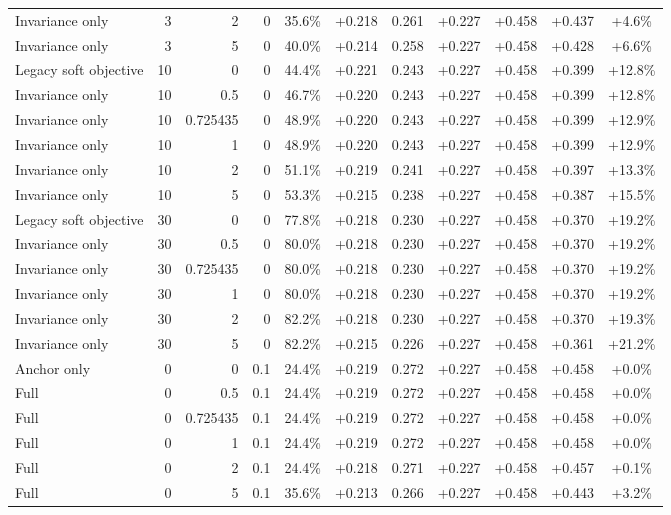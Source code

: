\begin{table}[htbp]
\begin{tabular}{lrrrccccccc}
Invariance only & 3 & 2 & 0 & 35.6\% & +0.218 & 0.261 & +0.227 & +0.458 & +0.437 & +4.6\% \\
Invariance only & 3 & 5 & 0 & 40.0\% & +0.214 & 0.258 & +0.227 & +0.458 & +0.428 & +6.6\% \\
Legacy soft objective & 10 & 0 & 0 & 44.4\% & +0.221 & 0.243 & +0.227 & +0.458 & +0.399 & +12.8\% \\
Invariance only & 10 & 0.5 & 0 & 46.7\% & +0.220 & 0.243 & +0.227 & +0.458 & +0.399 & +12.8\% \\
Invariance only & 10 & 0.725435 & 0 & 48.9\% & +0.220 & 0.243 & +0.227 & +0.458 & +0.399 & +12.9\% \\
Invariance only & 10 & 1 & 0 & 48.9\% & +0.220 & 0.243 & +0.227 & +0.458 & +0.399 & +12.9\% \\
Invariance only & 10 & 2 & 0 & 51.1\% & +0.219 & 0.241 & +0.227 & +0.458 & +0.397 & +13.3\% \\
Invariance only & 10 & 5 & 0 & 53.3\% & +0.215 & 0.238 & +0.227 & +0.458 & +0.387 & +15.5\% \\
Legacy soft objective & 30 & 0 & 0 & 77.8\% & +0.218 & 0.230 & +0.227 & +0.458 & +0.370 & +19.2\% \\
Invariance only & 30 & 0.5 & 0 & 80.0\% & +0.218 & 0.230 & +0.227 & +0.458 & +0.370 & +19.2\% \\
Invariance only & 30 & 0.725435 & 0 & 80.0\% & +0.218 & 0.230 & +0.227 & +0.458 & +0.370 & +19.2\% \\
Invariance only & 30 & 1 & 0 & 80.0\% & +0.218 & 0.230 & +0.227 & +0.458 & +0.370 & +19.2\% \\
Invariance only & 30 & 2 & 0 & 82.2\% & +0.218 & 0.230 & +0.227 & +0.458 & +0.370 & +19.3\% \\
Invariance only & 30 & 5 & 0 & 82.2\% & +0.215 & 0.226 & +0.227 & +0.458 & +0.361 & +21.2\% \\
Anchor only & 0 & 0 & 0.1 & 24.4\% & +0.219 & 0.272 & +0.227 & +0.458 & +0.458 & +0.0\% \\
Full & 0 & 0.5 & 0.1 & 24.4\% & +0.219 & 0.272 & +0.227 & +0.458 & +0.458 & +0.0\% \\
Full & 0 & 0.725435 & 0.1 & 24.4\% & +0.219 & 0.272 & +0.227 & +0.458 & +0.458 & +0.0\% \\
Full & 0 & 1 & 0.1 & 24.4\% & +0.219 & 0.272 & +0.227 & +0.458 & +0.458 & +0.0\% \\
Full & 0 & 2 & 0.1 & 24.4\% & +0.218 & 0.271 & +0.227 & +0.458 & +0.457 & +0.1\% \\
Full & 0 & 5 & 0.1 & 35.6\% & +0.213 & 0.266 & +0.227 & +0.458 & +0.443 & +3.2\% \\

\end{tabular}
\end{table}
